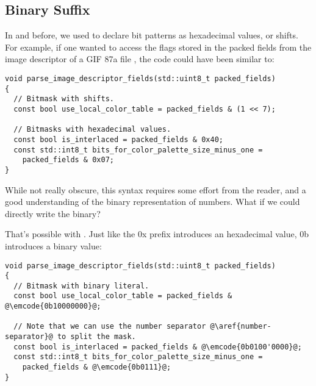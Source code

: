 \subsection{Binary Suffix}

\problemtitle

In  and before, we used to declare bit patterns as hexadecimal
values, or shifts. For example, if one wanted to access the flags
stored in the packed fields from the image descriptor of a GIF 87a
file \cite{gif87a}, the code could have been similar to:

\begin{lstlisting}
void parse_image_descriptor_fields(std::uint8_t packed_fields)
{
  // Bitmask with shifts.
  const bool use_local_color_table = packed_fields & (1 << 7);

  // Bitmasks with hexadecimal values.
  const bool is_interlaced = packed_fields & 0x40;
  const std::int8_t bits_for_color_palette_size_minus_one =
    packed_fields & 0x07;
}
\end{lstlisting}

While not really obscure, this syntax requires some effort from the
reader, and a good understanding of the binary representation of
numbers. What if we could directly write the binary?

\solutiontitle

That's possible with . Just like the 0x prefix introduces an
hexadecimal value, 0b introduces a binary value:

\begin{lstlisting}
void parse_image_descriptor_fields(std::uint8_t packed_fields)
{
  // Bitmask with binary literal.
  const bool use_local_color_table = packed_fields & @\emcode{0b10000000}@;

  // Note that we can use the number separator @\aref{number-separator}@ to split the mask.
  const bool is_interlaced = packed_fields & @\emcode{0b0100'0000}@;
  const std::int8_t bits_for_color_palette_size_minus_one =
    packed_fields & @\emcode{0b0111}@;
}
\end{lstlisting}
